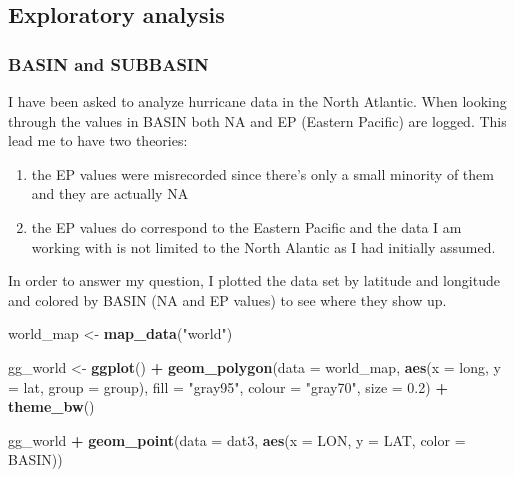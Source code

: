 \documentclass[
]{article}
\newenvironment{Shaded}{\begin{snugshade}}{\end{snugshade}}
\newcommand{\DataTypeTok}[1]{\textcolor[rgb]{0.13,0.29,0.53}{#1}}
\newcommand{\FloatTok}[1]{\textcolor[rgb]{0.00,0.00,0.81}{#1}}
\newcommand{\KeywordTok}[1]{\textcolor[rgb]{0.13,0.29,0.53}{\textbf{#1}}}
\newcommand{\NormalTok}[1]{#1}
\newcommand{\OperatorTok}[1]{\textcolor[rgb]{0.81,0.36,0.00}{\textbf{#1}}}
\newcommand{\StringTok}[1]{\textcolor[rgb]{0.31,0.60,0.02}{#1}}
\providecommand{\tightlist}{%
  \setlength{\itemsep}{0pt}\setlength{\parskip}{0pt}}
\begin{document}
\hypertarget{exploratory-analysis}{%
\subsection{Exploratory analysis}\label{exploratory-analysis}}

\hypertarget{basin-and-subbasin}{%
\subsubsection{BASIN and SUBBASIN}\label{basin-and-subbasin}}

I have been asked to analyze hurricane data in the North Atlantic. When
looking through the values in BASIN both NA and EP (Eastern Pacific) are
logged. This lead me to have two theories:

\begin{enumerate}
\def\labelenumi{\arabic{enumi})}
\tightlist
\item
  the EP values were misrecorded since there's only a small minority of
  them and they are actually NA
\item
  the EP values do correspond to the Eastern Pacific and the data I am
  working with is not limited to the North Alantic as I had initially
  assumed.
\end{enumerate}

In order to answer my question, I plotted the data set by latitude and
longitude and colored by BASIN (NA and EP values) to see where they show
up.

\begin{Shaded}
\begin{Highlighting}[]
\NormalTok{world_map <-}\StringTok{ }\KeywordTok{map_data}\NormalTok{(}\StringTok{"world"}\NormalTok{)}

\NormalTok{gg_world <-}\StringTok{ }\KeywordTok{ggplot}\NormalTok{() }\OperatorTok{+}\StringTok{ }
\StringTok{  }\KeywordTok{geom_polygon}\NormalTok{(}\DataTypeTok{data =}\NormalTok{ world_map, }
               \KeywordTok{aes}\NormalTok{(}\DataTypeTok{x =}\NormalTok{ long, }\DataTypeTok{y =}\NormalTok{ lat, }\DataTypeTok{group =}\NormalTok{ group), }
               \DataTypeTok{fill =} \StringTok{"gray95"}\NormalTok{, }\DataTypeTok{colour =} \StringTok{"gray70"}\NormalTok{, }\DataTypeTok{size =} \FloatTok{0.2}\NormalTok{) }\OperatorTok{+}
\StringTok{  }\KeywordTok{theme_bw}\NormalTok{()}
\end{Highlighting}
\end{Shaded}

\begin{Shaded}
\begin{Highlighting}[]
\NormalTok{gg_world }\OperatorTok{+}\StringTok{ }
\StringTok{  }\KeywordTok{geom_point}\NormalTok{(}\DataTypeTok{data =}\NormalTok{ dat3, }\KeywordTok{aes}\NormalTok{(}\DataTypeTok{x =}\NormalTok{ LON, }\DataTypeTok{y =}\NormalTok{ LAT, }\DataTypeTok{color =}\NormalTok{ BASIN))}
\end{Highlighting}
\end{Shaded}
\end{document}
